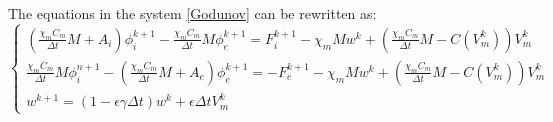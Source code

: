\documentclass[a4paper,11pt]{article}
\begin{document}
The equations in the system \ref{Godunov} can be rewritten as:
\begin{equation*}
\begin{cases}
\left( \frac{\chi_m C_m}{\Delta t} M + A_i \right ) \phi_i^{k+1} - \frac{\chi_m C_m}{\Delta t} M \phi_e^{k+1} = F_i^{k+1} - \chi_m M w^k + \left( \frac{\chi_m C_m}{\Delta t} M- C(V_m^k)\right) V_m^k\\
\frac{\chi_m C_m}{\Delta t} M  \phi_i^{n+1} - \left(\frac{\chi_m C_m}{\Delta t} M + A_e \right) \phi_e^{k+1} =  -F_e^{k+1} - \chi_m M w^k + \left( \frac{\chi_m C_m}{\Delta t} M- C(V_m^k)\right) V_m^k \\
w^{k+1} = (1-\epsilon \gamma \Delta t) w^k + \epsilon \Delta tV_m^k
\end{cases}
\end{equation*}
\end{document}
